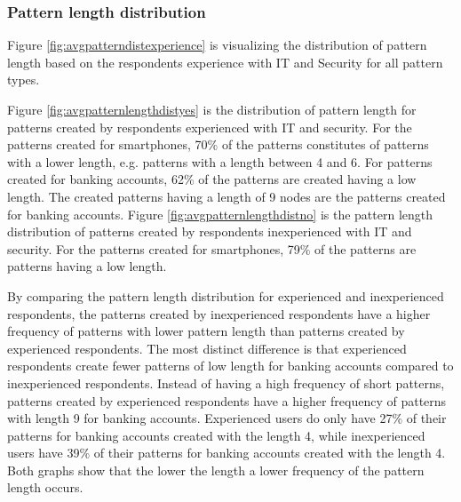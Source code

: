     \subsubsection{Pattern length distribution}
    Figure \ref{fig:avgpatterndistexperience} is visualizing the distribution of pattern length based on the respondents experience with IT and Security for all pattern types. 

    Figure \ref{fig:avgpatternlengthdistyes} is the distribution of pattern length for patterns created by respondents experienced with IT and security. For the patterns created for smartphones, 70\% of the patterns constitutes of patterns with a lower length, e.g. patterns with a length between 4 and 6. For patterns created for banking accounts, 62\% of the patterns are created having a low length. The created patterns having a length of 9 nodes are the patterns created for banking accounts. Figure \ref{fig:avgpatternlengthdistno} is the pattern length distribution of patterns created by respondents inexperienced with IT and security. For the patterns created for smartphones, 79\% of the patterns are patterns having a low length.

    By comparing the pattern length distribution for experienced and inexperienced respondents, the patterns created by inexperienced respondents have a higher frequency of patterns with lower pattern length than patterns created by experienced respondents. The most distinct difference is that experienced respondents create fewer patterns of low length for banking accounts compared to inexperienced respondents. Instead of having a high frequency of short patterns, patterns created by experienced respondents have a higher frequency of patterns with length 9 for banking accounts. Experienced users do only have 27\% of their patterns for banking accounts created with the length 4, while inexperienced users have 39\% of their patterns for banking accounts created with the length 4. Both graphs show that the lower the length a lower frequency of the pattern length occurs.

